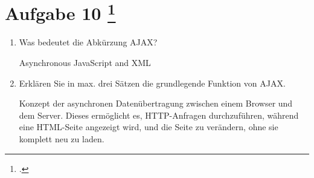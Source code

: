 \documentclass{lehramt-informatik-aufgabe}
\begin{document}
\section{Aufgabe 10
\footcite{66116:2021:03}}
\begin{enumerate}


\item Was bedeutet die Abkürzung AJAX?

\begin{liAntwort}
Asynchronous JavaScript and XML
\end{liAntwort}


\item Erklären Sie in max. drei Sätzen die grundlegende Funktion von AJAX.

\begin{liAntwort}
Konzept der asynchronen Datenübertragung zwischen einem Browser und dem
Server. Dieses ermöglicht es, HTTP-Anfragen durchzuführen, während eine
HTML-Seite angezeigt wird, und die Seite zu verändern, ohne sie komplett
neu zu laden.
\end{liAntwort}
\end{enumerate}
\end{document}

